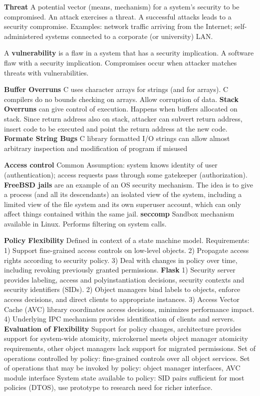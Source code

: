 \documentclass[6pt,landscape]{article}
\begin{document}
\begin{multicols}{3}
{\bf Threat} A potential vector (means, mechanism) for a system’s security to be compromised. An attack exercises a threat. A successful attacks leads to a security compromise. Examples: network traffic arriving from the Internet; self-administered systems connected to a corporate (or university) LAN.

A {\bf vulnerability} is a flaw in a system that has a security implication. A software flaw with a security implication. Compromises occur when attacker matches threats with vulnerabilities.

{\bf Buffer Overruns} C uses character arrays for strings (and for arrays). C compilers do no bounds checking on arrays. Allow corruption of data.
{\bf Stack Overruns} can give control of execution. Happens when buffers allocated on stack. Since return address also on stack, attacker can subvert return address, insert code to be executed and point the return address at the new code.
{\bf Formate String Bugs} C library formatted I/O strings can allow almost arbitrary inspection and modification of program if misused

{\bf Access control}  Common Assumption: system knows identity of user (authentication); access requests pass through some gatekeeper (authorization).
{\bf FreeBSD jails} are an example of an OS security mechanism. The idea is to give a process (and all its descendants) an isolated view of the system, including a limited view of the file system and its own superuser account, which can only affect things contained within the same jail.
{\bf seccomp} Sandbox mechanism available in Linux. Performs filtering on system calls.

{\bf Policy Flexibility} Defined in context of a state machine model. Requirements: 
1) Support fine-grained access controls on low-level objects.
2) Propagate access rights according to security policy.
3) Deal with changes in policy over time, including revoking previously granted permissions.
{\bf Flask} 1) Security server provides labeling, access and polyinstantiation decisions, security contexts and security identifiers (SIDs).
2) Object managers bind labels to objects, enforce access decisions, and direct clients to appropriate instances.
3) Access Vector Cache (AVC) library coordinates access decisions, minimizes performance impact.
4) Underlying IPC mechanism provides identification of clients and servers.
{\bf Evaluation of Flexibility} Support for policy changes, architecture provides support for system-wide atomicity, microkernel meets object manager atomicity requirements, other object managers lack support for migrated permissions.
Set of operations controlled by policy: fine-grained controls over all object services.
Set of operations that may be invoked by policy: object manager interfaces, AVC module interface
System state available to policy: SID pairs sufficient for most policies (DTOS), use prototype to research need for richer interface.


\end{multicols}
\end{document}
